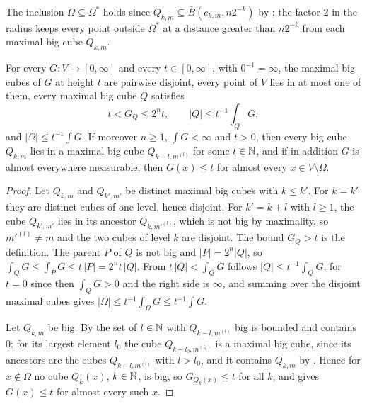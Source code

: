 The inclusion $\Omega \subseteq \Omega^*$ holds since $Q_{k,m} \subseteq \bar B(c_{k,m}, n 2^{-k})$
by ; the factor $2$ in the radius keeps every point outside $\Omega^*$ at
a distance greater than $n 2^{-k}$ from each maximal big cube $Q_{k,m}$.

\begin{theorem}
\label{thm:calderon-zygmund}
\leanok
{}
For every $G : V \to [0, \infty]$ and every $t \in [0, \infty]$, with $0^{-1} = \infty$, the
maximal big cubes of $G$ at height $t$ are pairwise disjoint, every point of $V$ lies in at most
one of them, every maximal big cube $Q$ satisfies
\[
  t < G_Q \leq 2^n t, \qquad |Q| \leq t^{-1} \int_Q G,
\]
and $|\Omega| \leq t^{-1} \int G$. If moreover $n \geq 1$, $\int G < \infty$ and $t > 0$, then
every big cube $Q_{k,m}$ lies in a maximal big cube $Q_{k-l,m^{(l)}}$ for some $l \in \mathbb{N}$, and if
in addition $G$ is almost everywhere measurable, then $G(x) \leq t$ for almost every
$x \in V \setminus \Omega$.
\end{theorem}

\begin{proof}
\leanok
Let $Q_{k,m}$ and $Q_{k',m'}$ be distinct maximal big cubes with $k \leq k'$. For $k = k'$ they
are distinct cubes of one level, hence disjoint. For $k' = k + l$ with $l \geq 1$, the cube
$Q_{k',m'}$ lies in its ancestor $Q_{k,m'^{(l)}}$, which is not big by maximality, so
$m'^{(l)} \neq m$ and the two cubes of level $k$ are disjoint. The bound $G_Q > t$ is the
definition. The parent $P$ of $Q$ is not big and $|P| = 2^n |Q|$, so
$\int_Q G \leq \int_P G \leq t \, |P| = 2^n t \, |Q|$. From $t \, |Q| < \int_Q G$ follows
$|Q| \leq t^{-1} \int_Q G$, for $t = 0$ since then $\int_Q G > 0$ and the right side is
$\infty$, and summing over the disjoint maximal cubes gives
$|\Omega| \leq t^{-1} \int_\Omega G \leq t^{-1} \int G$.

Let $Q_{k,m}$ be big. By  the set of $l \in \mathbb{N}$ with
$Q_{k-l,m^{(l)}}$ big is bounded and contains $0$; for its largest element $l_0$ the cube
$Q_{k-l_0,m^{(l_0)}}$ is a maximal big cube, since its ancestors are the cubes
$Q_{k-l,m^{(l)}}$ with $l > l_0$, and it contains $Q_{k,m}$ by .
Hence for $x \notin \Omega$ no cube $Q_k(x)$, $k \in \mathbb{N}$, is big, so $G_{Q_k(x)} \leq t$ for
all $k$, and  gives $G(x) \leq t$ for almost every
such $x$.
\end{proof}

